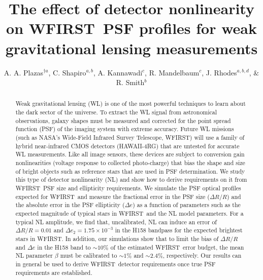 \documentclass[11pt,preprint,flushrt]{aastex}
\begin{document}
\newcommand {\gs} {{\tt{GalSim}}}  
\newcommand {\wf} {WFIRST}  
\newcommand {\wfa} {WFIRST}  
\newcommand {\optical} {{\tt{OpticalPSF}}} 
\newcommand {\gauss} {{\tt{Gaussian}}} 


\title{The effect of detector nonlinearity on \wfa\ PSF profiles for weak gravitational lensing measurements}
\author{A. A. Plazas$^{\dagger a}$, C. Shapiro$^{a,b}$, A. Kannawadi$^c$, R. Mandelbaum$^c$, J. Rhodes$^{a,b,d}$, $\&$ R. Smith$^b$  }

\begin{abstract}
Weak gravitational lensing (WL) is one of the most powerful techniques to learn about the dark sector of the universe. To extract the WL signal from astronomical observations, galaxy shapes must be measured and corrected for the point spread function (PSF) of the imaging system with extreme accuracy. Future WL missions (such as NASA's Wide-Field Infrared Survey Telescope, WFIRST) will use a family of hybrid near-infrared CMOS detectors (HAWAII-4RG) that are untested for accurate WL measurements.  Like all image sensors, these devices are subject to conversion gain nonlinearities (voltage response to collected photo-charge) that bias the shape and size of bright objects such as reference stars that are used in PSF determination.
We study this type of detector nonlinearity (NL) and show how to derive requirements on it from \wf\ PSF size and ellipticity requirements. We simulate the PSF optical profiles expected for \wf\, and measure the fractional error in the PSF size ($\Delta R/R$) and the absolute error in the PSF ellipticity ($\Delta e$) as a function of parameters such as the expected magnitude of typical stars in \wf\ and the NL model parameters. For a typical NL amplitude, we find that, uncalibrated, NL can induce an error of $\Delta R/R=0.01$ and $\Delta e_2=1.75\times 10^{-3}$ in the H158 bandpass for the expected brightest stars in \wf. In addition, our simulations show that to limit the bias of $\Delta R/R$ and $\Delta e$ in the H158 band to $\sim 10\%$ of the estimated \wf\ error budget, the mean NL parameter $\beta$ must be calibrated to $\sim1\%$ and $\sim 2.4\%$, respectively. Our results can in general be used to derive \wf\ detector requirements once true PSF requirements are established.  
\end{abstract}
\end{document}
